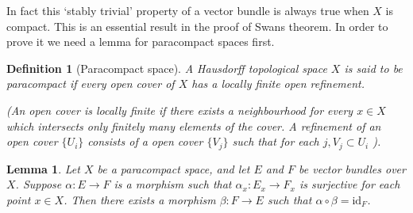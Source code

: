 \documentclass[12pt]{report}
\numberwithin{equation}{section}
\newtheorem{definition}[dummy]{Definition}
\newtheorem{lemma}[dummy]{Lemma}
\begin{document}
	In fact this `stably trivial' property of a vector bundle is always true when $X$ is compact. This is an essential result in the proof of Swans theorem. In order to prove it we need a lemma for paracompact spaces first.
	\begin{definition}[Paracompact space]
		A  Hausdorff topological space $X$ is said to be paracompact if every open cover of $X$ has a locally finite open refinement.
		
		(An open cover is locally finite if there exists a neighbourhood for every $x \in X$ which intersects only finitely many elements of the cover.
		A refinement of an open cover $\{U_i\}$ consists of a open cover $\{V_j\}$ such that for each $j, V_j	\subset U_i$ ).
	\end{definition}
	
	\begin{lemma}
		Let \( X \) be a paracompact space, and let \( E \) and \( F \) be vector bundles over \( X \). Suppose \( \alpha: E \to F \) is a morphism such that \( \alpha_x: E_x \to F_x \) is surjective for each point \( x \in X \). Then there exists a morphism \( \beta: F \to E \) such that \( \alpha \circ \beta = \mathrm{id}_F \).
	\end{lemma}
\end{document}
